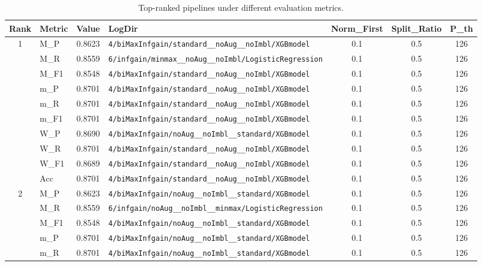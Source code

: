 \begin{table}[htbp]
\caption{Top-ranked pipelines under different evaluation metrics.}
\label{tab:rank_metric_vertical}
\centering
\small
\setlength{\tabcolsep}{4pt}
\begin{tabular}{|c|l|c|>{\ttfamily\footnotesize}p{7.2cm}|c|c|c|}
\hline
Rank & Metric & Value & LogDir & Norm\_First & Split\_Ratio & P\_th \\
\hline
\multirow{10}{*}{1} & M\_P & 0.8623 & \texttt{4/biMaxInfgain/standard\_\_noAug\_\_noImbl/XGBmodel} & 0.1 & 0.5  & 126 \\ 
 & M\_R & 0.8559 & \texttt{6/infgain/minmax\_\_noAug\_\_noImbl/LogisticRegression} & 0.1 & 0.5  & 126 \\ 
 & M\_F1 & 0.8548 & \texttt{4/biMaxInfgain/standard\_\_noAug\_\_noImbl/XGBmodel} & 0.1 & 0.5  & 126 \\ 
 & m\_P & 0.8701 & \texttt{4/biMaxInfgain/standard\_\_noAug\_\_noImbl/XGBmodel} & 0.1 & 0.5  & 126 \\ 
 & m\_R & 0.8701 & \texttt{4/biMaxInfgain/standard\_\_noAug\_\_noImbl/XGBmodel} & 0.1 & 0.5  & 126 \\ 
 & m\_F1 & 0.8701 & \texttt{4/biMaxInfgain/standard\_\_noAug\_\_noImbl/XGBmodel} & 0.1 & 0.5  & 126 \\ 
 & W\_P & 0.8690 & \texttt{4/biMaxInfgain/noAug\_\_noImbl\_\_standard/XGBmodel} & 0.1 & 0.5  & 126 \\ 
 & W\_R & 0.8701 & \texttt{4/biMaxInfgain/standard\_\_noAug\_\_noImbl/XGBmodel} & 0.1 & 0.5  & 126 \\ 
 & W\_F1 & 0.8689 & \texttt{4/biMaxInfgain/standard\_\_noAug\_\_noImbl/XGBmodel} & 0.1 & 0.5  & 126 \\ 
 & Acc & 0.8701 & \texttt{4/biMaxInfgain/standard\_\_noAug\_\_noImbl/XGBmodel} & 0.1 & 0.5  & 126 \\ 
\hline
\multirow{10}{*}{2} & M\_P & 0.8623 & \texttt{4/biMaxInfgain/noAug\_\_noImbl\_\_standard/XGBmodel} & 0.1 & 0.5  & 126 \\ 
 & M\_R & 0.8559 & \texttt{6/infgain/noAug\_\_noImbl\_\_minmax/LogisticRegression} & 0.1 & 0.5  & 126 \\ 
 & M\_F1 & 0.8548 & \texttt{4/biMaxInfgain/noAug\_\_noImbl\_\_standard/XGBmodel} & 0.1 & 0.5  & 126 \\ 
 & m\_P & 0.8701 & \texttt{4/biMaxInfgain/noAug\_\_noImbl\_\_standard/XGBmodel} & 0.1 & 0.5  & 126 \\ 
 & m\_R & 0.8701 & \texttt{4/biMaxInfgain/noAug\_\_noImbl\_\_standard/XGBmodel} & 0.1 & 0.5  & 126 \\ 

\end{tabular}
\end{table}
